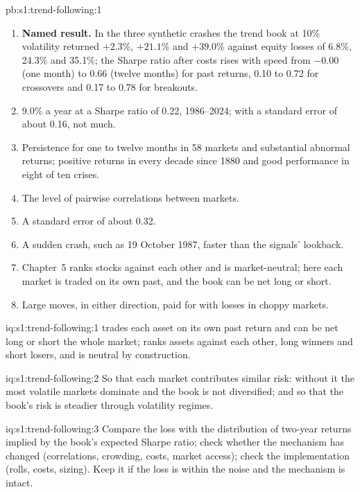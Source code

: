 \begin{solution}{pb:s1:trend-following:1}
\begin{enumerate}
\item \textbf{Named result.} In the three synthetic crashes the trend book at 10\% volatility returned $+2.3\%$, $+21.1\%$ and $+39.0\%$ against equity
losses of 6.8\%, 24.3\% and 35.1\%; the Sharpe ratio after costs rises with speed from $-0.00$ (one month) to 0.66 (twelve months) for past returns,
0.10 to 0.72 for crossovers and 0.17 to 0.78 for breakouts.
\item 9.0\% a year at a Sharpe ratio of 0.22, 1986--2024; with a standard error of about 0.16, not much.
\item Persistence for one to twelve months in 58 markets and substantial abnormal returns; positive returns in every decade since 1880 and good
performance in eight of ten crises.
\item The level of pairwise correlations between markets.
\item A standard error of about 0.32.
\item A sudden crash, such as 19 October 1987, faster than the signals' lookback.
\item Chapter~5 ranks stocks against each other and is market-neutral; here each market is traded on its own past, and the book can be net long or short.
\item Large moves, in either direction, paid for with losses in choppy markets.
\end{enumerate}
\end{solution}

\begin{solution}{iq:s1:trend-following:1}
 trades each asset on its own past return and can be net long or short the whole market;  ranks assets
against each other, long winners and short losers, and is neutral by construction.
\end{solution}

\begin{solution}{iq:s1:trend-following:2}
So that each market contributes similar risk: without it the most volatile markets dominate and the book is not diversified; and so that the book's risk
is steadier through volatility regimes.
\end{solution}

\begin{solution}{iq:s1:trend-following:3}
Compare the loss with the distribution of two-year returns implied by the book's expected Sharpe ratio; check whether the mechanism has changed (correlations,
crowding, costs, market access); check the implementation (rolls, costs, sizing). Keep it if the loss is within the noise and the mechanism is intact.
\end{solution}

